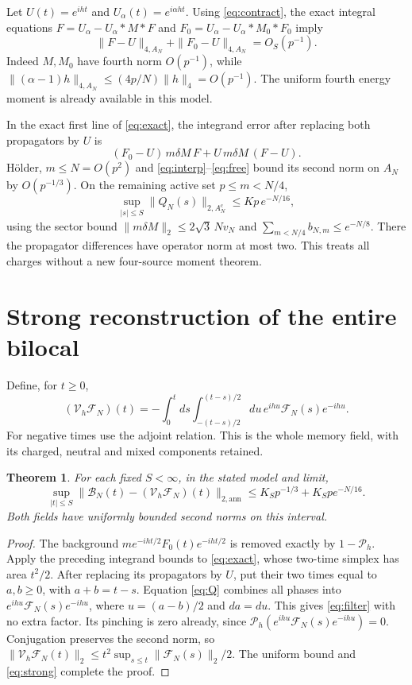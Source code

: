 \documentclass[11pt]{article}
\newcommand{\PP}{\mathcal P_h}
\newcommand{\FF}{\mathcal F}
\newcommand{\BB}{\mathcal B}
\newtheorem{theorem}{Theorem}
\begin{document}
Let $U(t)=e^{iht}$ and $U_\alpha(t)=e^{i\alpha ht}$.
Using \eqref{eq:contract}, the exact integral equations
$F=U_\alpha-U_\alpha*M*F$ and
$F_0=U_\alpha-U_\alpha*M_0*F_0$ imply
\begin{equation}
 \|F-U\|_{4,A_N}+\|F_0-U\|_{4,A_N}=O_S(p^{-1}).\label{eq:free}
\end{equation}
Indeed $M,M_0$ have fourth norm $O(p^{-1})$, while
$\|(\alpha-1)h\|_{4,A_N}\le(4p/N)\|h\|_4=O(p^{-1})$.
The uniform fourth energy moment is already available in this model.

In the exact first line of \eqref{eq:exact}, the integrand error
after replacing both propagators by $U$ is
\begin{equation}
 (F_0-U)\,m\delta M\,F+U\,m\delta M\,(F-U).
\end{equation}
H\"older, $m\le N=O(p^2)$ and \eqref{eq:interp}--\eqref{eq:free}
bound its second norm on $A_N$ by $O(p^{-1/3})$.
On the remaining active set $p\le m<N/4$,
\begin{equation}
 \sup_{|s|\le S}\|Q_N(s)\|_{2,A_N^c}
 \le Kp\,e^{-N/16},
\end{equation}
using the sector bound $\|m\delta M\|_2\le2\sqrt{3}\,Nv_N$
and $\sum_{m<N/4}b_{N,m}\le e^{-N/8}$.
There the propagator differences have operator norm at most two.
This treats all charges without a new four-source moment theorem.

\newpage
\section{Strong reconstruction of the entire bilocal}
Define, for $t\ge0$,
\begin{equation}
 (\mathcal V_h\FF_N)(t)=
 -\int_0^t ds\int_{-(t-s)/2}^{(t-s)/2}du\,
 e^{ihu}\FF_N(s)e^{-ihu}.\label{eq:filter}
\end{equation}
For negative times use the adjoint relation. This is the whole
memory field, with its charged, neutral and mixed components retained.

\begin{theorem}
For each fixed $S<\infty$, in the stated model and limit,
\begin{equation}
 \sup_{|t|\le S}\|\BB_N(t)-(\mathcal V_h\FF_N)(t)\|_{2,\mathrm{ann}}
 \le K_Sp^{-1/3}+K_Sp e^{-N/16}.\label{eq:strong}
\end{equation}
Both fields have uniformly bounded second norms on this interval.
\end{theorem}
\begin{proof}
The background $m e^{-iht/2}F_0(t)e^{-iht/2}$ is removed exactly
by $1-\PP$. Apply the preceding integrand bounds to
\eqref{eq:exact}, whose two-time simplex has area $t^2/2$.
After replacing its propagators by $U$, put their two times equal
to $a,b\ge0$, with $a+b=t-s$. Equation \eqref{eq:Q} combines all
phases into $e^{ihu}\FF_N(s)e^{-ihu}$, where $u=(a-b)/2$ and
$da=du$. This gives \eqref{eq:filter} with no extra factor.
Its pinching is zero already, since
$\PP(e^{ihu}\FF_N(s)e^{-ihu})=0$.
Conjugation preserves the second norm, so
$\|\mathcal V_h\FF_N(t)\|_2\le t^2\sup_{s\le t}\|\FF_N(s)\|_2/2$.
The uniform bound and \eqref{eq:strong} complete the proof.
\end{proof}
\end{document}
